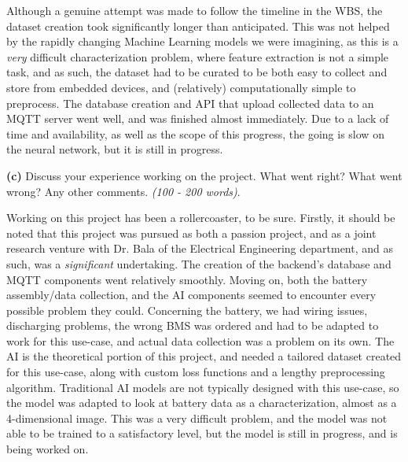 \documentclass{article}
\begin{document}
\begin{singlespace}
    \fontsize{10}{12}\selectfont
    Although a genuine attempt was made to follow the timeline in the WBS, the dataset creation took significantly longer than anticipated. This was not helped by the rapidly changing Machine Learning models we were imagining, as this is a \textit{very} difficult characterization problem, where feature extraction is not a simple task, and as such, the dataset had to be curated to be both easy to collect and store from embedded devices, and (relatively) computationally simple to preprocess. The database creation and API that upload collected data to an MQTT server went well, and was finished almost immediately. Due to a lack of time and availability, as well as the scope of this progress, the going is slow on the neural network, but it is still in progress.
\end{singlespace}

\pagebreak

\textbf{(c)} Discuss your experience working on the project. What went right? What went wrong? Any other comments. \textit{(100 - 200 words)}.

\vspace{0.5cm}

\begin{singlespace}
    \fontsize{10}{12}\selectfont
    Working on this project has been a rollercoaster, to be sure. Firstly, it should be noted that this project was pursued as both a passion project, and as a joint research venture with Dr. Bala of the Electrical Engineering department, and as such, was a \textit{significant} undertaking. The creation of the backend's database and MQTT components went relatively smoothly. Moving on, both the battery assembly/data collection, and the AI components seemed to encounter every possible problem they could. Concerning the battery, we had wiring issues, discharging problems, the wrong BMS was ordered and had to be adapted to work for this use-case, and actual data collection was a problem on its own. The AI is the theoretical portion of this project, and needed a tailored dataset created for this use-case, along with custom loss functions and a lengthy preprocessing algorithm. Traditional AI models are not typically designed with this use-case, so the model was adapted to look at battery data as a characterization, almost as a 4-dimensional image. This was a very difficult problem, and the model was not able to be trained to a satisfactory level, but the model is still in progress, and is being worked on.
\end{singlespace}
\end{document}
